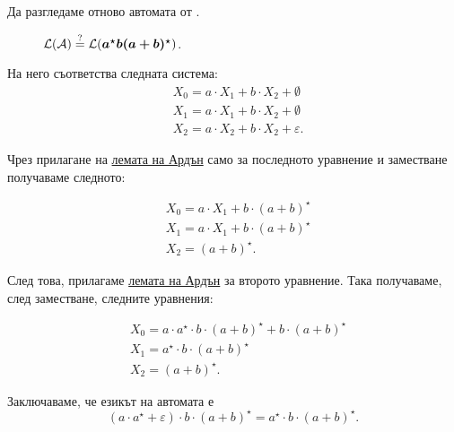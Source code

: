 \begin{example}
Да разгледаме отново автомата от .

\begin{figure}[H]
  \begin{center}
  \end{center}
  \caption{$\mathcal{L}(\mathcal{A}) \stackrel{?}{=} \mathcal{L}(\bm{a^\star b(a+b)^\star})$.}
\end{figure}

На него съответства следната система:
\begin{align*}
  & X_0 = a \cdot X_1 + b \cdot X_2 + \emptyset\\
  & X_1 = a \cdot X_1 + b \cdot X_2 + \emptyset\\
  & X_2 = a \cdot X_2 + b \cdot X_2 + \varepsilon.
\end{align*}

Чрез прилагане на \hyperref[lem:regular:system:arden]{лемата на Ардън} само за последното уравнение и заместване получаваме следното:

\begin{align*}
  & X_0 = a \cdot X_1 + b \cdot (a+b)^\star\\
  & X_1 = a \cdot X_1 + b \cdot (a+b)^\star\\
  & X_2 = (a+b)^\star.
\end{align*}

След това, прилагаме \hyperref[lem:regular:system:arden]{лемата на Ардън} за второто уравнение. Така получаваме, след заместване, следните уравнения:

\begin{align*}
  & X_0 = a \cdot a^\star \cdot b \cdot (a+b)^\star + b \cdot (a+b)^\star\\
  & X_1 = a^\star \cdot b \cdot (a+b)^\star\\
  & X_2 = (a+b)^\star.
\end{align*}

Заключаваме, че езикът на автомата е
\[(a \cdot a^\star + \varepsilon) \cdot b \cdot (a+b)^\star = a^\star \cdot b \cdot (a+b)^\star.\]
  
\end{example}




